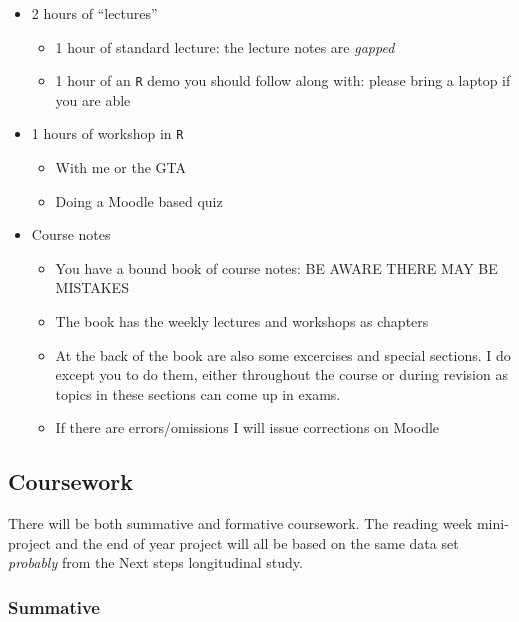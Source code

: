 \documentclass[
]{gitbook}
\providecommand{\tightlist}{%
  \setlength{\itemsep}{0pt}\setlength{\parskip}{0pt}}
\begin{document}
\begin{itemize}
\tightlist
\item
  2 hours of ``lectures''

  \begin{itemize}
  \tightlist
  \item
    1 hour of standard lecture: the lecture notes are \emph{gapped}
  \item
    1 hour of an \texttt{R} demo you should follow along with: please bring a laptop if you are able
  \end{itemize}
\item
  1 hours of workshop in \texttt{R}

  \begin{itemize}
  \tightlist
  \item
    With me or the GTA
  \item
    Doing a Moodle based quiz
  \end{itemize}
\item
  Course notes

  \begin{itemize}
  \tightlist
  \item
    You have a bound book of course notes: BE AWARE THERE MAY BE MISTAKES
  \item
    The book has the weekly lectures and workshops as chapters
  \item
    At the back of the book are also some excercises and special sections. I do except you to do them, either throughout the course or during revision as topics in these sections can come up in exams.
  \item
    If there are errors/omissions I will issue corrections on Moodle
  \end{itemize}
\end{itemize}

\hypertarget{coursework}{%
\subsection{Coursework}\label{coursework}}

There will be both summative and formative coursework. The reading week mini-project and the end of year project will all be based on the same data set \emph{probably} from the Next steps longitudinal study.

\hypertarget{summative}{%
\subsubsection{Summative}\label{summative}}
\end{document}
